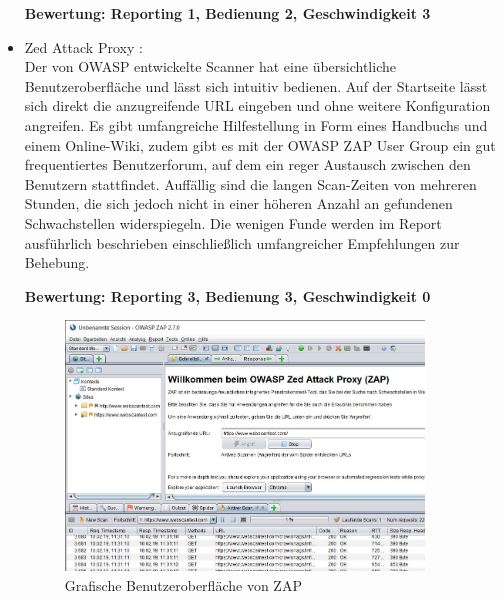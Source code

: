 \documentclass[12pt,oneside,a4paper,parskip]{scrbook}
\begin{document}
\begin{itemize}
            \textbf{Bewertung: Reporting 1, Bedienung 2, Geschwindigkeit 3}

          \item Zed Attack Proxy \cite{ZAP}:\\
            Der von OWASP entwickelte Scanner hat eine übersichtliche Benutzeroberfläche und lässt sich intuitiv bedienen. Auf der Startseite lässt sich direkt die anzugreifende URL eingeben und ohne weitere Konfiguration angreifen. Es gibt umfangreiche Hilfestellung in Form eines Handbuchs und einem Online-Wiki, zudem gibt es mit der OWASP ZAP User Group ein gut frequentiertes Benutzerforum, auf dem ein reger Austausch zwischen den Benutzern stattfindet.
            Auffällig sind die langen Scan-Zeiten von mehreren Stunden, die sich jedoch nicht in einer höheren Anzahl an gefundenen Schwachstellen widerspiegeln. Die wenigen Funde werden im Report ausführlich beschrieben einschließlich umfangreicher Empfehlungen zur Behebung.

            \textbf{Bewertung: Reporting 3, Bedienung 3, Geschwindigkeit 0}
          \begin{figure}[H]
            \centering
            \includegraphics[width=0.9\textwidth]{Images/ZAP}
            \caption[Grafische Benutzeroberfläche von ZAP]{Grafische Benutzeroberfläche von ZAP}
          \end{figure}
        \end{itemize}
\end{document}
